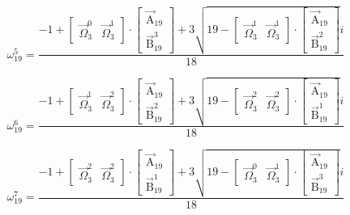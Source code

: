 \documentclass{article}
\begin{document}
\[ \omega_{19}^{5}=\frac{-1+\left[ \begin{matrix} \vec{\Omega}_{3}^{0} & \vec{\Omega}_{3}^{1} \end{matrix} \right]\cdot\left[ \begin{matrix} \vec{\mathrm{A}}_{19} \\ \vec{\mathrm{B}}_{19}^{3} \end{matrix} \right]+3\sqrt{19-\left[ \begin{matrix} \vec{\Omega}_{3}^{1} & \vec{\Omega}_{3}^{1} \end{matrix} \right]\cdot\left[ \begin{matrix} \vec{\mathrm{A}}_{19} \\ \vec{\mathrm{B}}_{19}^{2} \end{matrix} \right]}i}{18} \]

\[ \omega_{19}^{6}=\frac{-1+\left[ \begin{matrix} \vec{\Omega}_{3}^{1} & \vec{\Omega}_{3}^{2} \end{matrix} \right]\cdot\left[ \begin{matrix} \vec{\mathrm{A}}_{19} \\ \vec{\mathrm{B}}_{19}^{2} \end{matrix} \right]+3\sqrt{19-\left[ \begin{matrix} \vec{\Omega}_{3}^{2} & \vec{\Omega}_{3}^{2} \end{matrix} \right]\cdot\left[ \begin{matrix} \vec{\mathrm{A}}_{19} \\ \vec{\mathrm{B}}_{19}^{1} \end{matrix} \right]}i}{18} \]

\[ \omega_{19}^{7}=\frac{-1+\left[ \begin{matrix} \vec{\Omega}_{3}^{2} & \vec{\Omega}_{3}^{2} \end{matrix} \right]\cdot\left[ \begin{matrix} \vec{\mathrm{A}}_{19} \\ \vec{\mathrm{B}}_{19}^{1} \end{matrix} \right]+3\sqrt{19-\left[ \begin{matrix} \vec{\Omega}_{3}^{0} & \vec{\Omega}_{3}^{1} \end{matrix} \right]\cdot\left[ \begin{matrix} \vec{\mathrm{A}}_{19} \\ \vec{\mathrm{B}}_{19}^{3} \end{matrix} \right]}i}{18} \]
\end{document}
